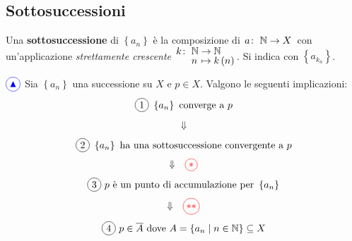 \subsection{Sottosuccessioni}
\begin{define}
Una \textbf{sottosuccessione} di $\left\{a_n\right\}$ è la composizione di $\funz{a}{\naturalset}{X}$ con un'applicazione \textit{strettamente crescente} $\funztot{k}{\naturalset}{\naturalset}{n}{k\left(n\right)}$. Si indica con $\left\{a_{k_n}\right\}$.
\end{define}
\begin{lemming}\label{lemmatriangolino} $\textcolor{blue}{\circled{{\large \blacktriangle}}}$ 	Sia $\left\{a_n\right\}$ una successione su $X$ e $p\in X$. Valgono le seguenti implicazioni:
	\begin{equation}
		\circled{1}\ \left\{a_n\right\}\text{ converge a }p
	\end{equation}
\begin{equation*}
	\begin{array}{ll}
	\Downarrow 
\end{array}
\end{equation*}
\begin{equation}
		\circled{2}\ \left\{a_n\right\}\text{ ha una sottosuccessione convergente a }p
\end{equation}
\begin{equation*}
\begin{array}{ll}
	\Downarrow &  \textcolor{red}{\circled{\ast}}
\end{array}
\end{equation*}
\begin{equation}
	\circled{3}\ p\text{ è un punto di accumulazione per }\left\{a_n\right\}
\end{equation}
	\begin{equation*}
	\begin{array}{ll}
		\Downarrow & \textcolor{red}{\circled{\ast\ast}}
	\end{array}
\end{equation*}
\begin{equation}
	\circled{4}\ p\in\overline{A}\text{ dove }A=\left\{a_n\mid n\in \naturalset\right\}\subseteq X
\end{equation}
\end{lemming}~{}\\
